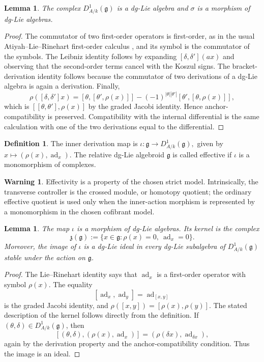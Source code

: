 \documentclass[11pt,reqno,a4paper,dvipsnames,x11names]{amsart}
\numberwithin{equation}{section}
\theoremstyle{plain}
\newtheorem{lemma}[theorem]{Lemma}
\theoremstyle{definition}
\newtheorem{definition}[theorem]{Definition}
\newtheorem{warning}[theorem]{Warning}
\theoremstyle{remark}
\newcommand{\kk}{k}
\newcommand{\g}{\mathfrak g}
\newcommand{\z}{\mathfrak z}
\newcommand{\from}{\colon}
\begin{document}
\begin{lemma}
The complex \(D^1_{A/\kk}(\g)\) is a dg-Lie algebra and \(\sigma\) is a morphism of dg-Lie algebras.
\end{lemma}

\begin{proof}
The commutator of two first-order operators is first-order, as in the usual Atiyah--Lie--Rinehart first-order calculus \cite{Atiyah57,Rinehart63}, and its symbol is the commutator of the symbols. The Leibniz identity follows by expanding \([\delta,\delta'](ax)\) and observing that the second-order terms cancel with the Koszul signs. The bracket-derivation identity follows because the commutator of two derivations of a dg-Lie algebra is again a derivation. Finally,
\[
 \rho([\delta,\delta']x)
 =[\theta,[\theta',\rho(x)]]
 -(-1)^{|\theta||\theta'|}[\theta',[\theta,\rho(x)]],
\]
which is \([[\theta,\theta'],\rho(x)]\) by the graded Jacobi identity. Hence anchor-compatibility is preserved. Compatibility with the internal differential is the same calculation with one of the two derivations equal to the differential.
\end{proof}

\begin{definition}
The inner derivation map is
$
 \iota\from \g\longrightarrow D^1_{A/\kk}(\g),
 $ given by $
 x\longmapsto (\rho(x),\operatorname{ad}_x).
$
The relative dg-Lie algebroid \(\g\) is called effective if \(\iota\) is a monomorphism of complexes.
\end{definition}

\begin{warning}
Effectivity is a property of the chosen strict model. Intrinsically, the transverse controller is the crossed module, or homotopy quotient; the ordinary effective quotient is used only when the inner-action morphism is represented by a monomorphism in the chosen cofibrant model.
\end{warning}

\begin{lemma}
The map \(\iota\) is a morphism of dg-Lie algebras. Its kernel is the complex
\[
 \z(\g):=\{x\in\g: \rho(x)=0,\ \operatorname{ad}_x=0\}.
\]
Moreover, the image of \(\iota\) is a dg-Lie ideal in every dg-Lie subalgebra of \(D^1_{A/\kk}(\g)\) stable under the action on \(\g\).
\end{lemma}

\begin{proof}
The Lie--Rinehart identity says that \(\operatorname{ad}_x\) is a first-order operator with symbol \(\rho(x)\). The equality
\[
 [\operatorname{ad}_x,\operatorname{ad}_y]=\operatorname{ad}_{[x,y]}
\]
is the graded Jacobi identity, and \(\rho([x,y])=[\rho(x),\rho(y)]\). The stated description of the kernel follows directly from the definition. If \((\theta,\delta)\in D^1_{A/\kk}(\g)\), then
\[
 [(\theta,\delta),(\rho(x),\operatorname{ad}_x)]
 =(\rho(\delta x),\operatorname{ad}_{\delta x}),
\]
again by the derivation property and the anchor-compatibility condition. Thus the image is an ideal.
\end{proof}
\end{document}
